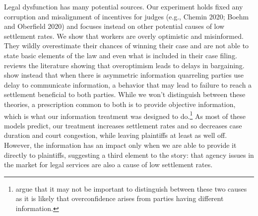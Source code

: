 \documentclass[11pt, a4paper]{article}
\begin{document}
Legal dysfunction has many potential sources. Our experiment holds fixed any corruption and misalignment of incentives for judges (e.g., Chemin 2020; Boehm and Oberfield 2020) and focuses instead on other potential causes of low settlement rates. We show that workers are overly optimistic and misinformed. They wildly overestimate their chances of winning their case and are not able to state basic elements of the law and even what is included in their case filing. \cite{doi:10.1146/annurev-economics-061109-080334} reviews the literature showing that overoptimism leads to delays in bargaining. \cite{Kennan_wilson} show instead that when there is asymmetric information quarreling parties use delay to communicate information, a behavior that may lead to failure to reach a settlement beneficial to both parties. While we won't distinguish between these theories, a prescription common to both is to provide objective information, which is what our information treatment was designed to do.\footnote{\cite{Kennan_wilson} argue that it may not be important to distinguish between these two causes as it is likely that overconfidence arises from parties having different information.} As most of these models predict, our treatment increases settlement rates and so decreases case duration and court congestion, while leaving plaintiffs at least as well off. However, the information has an impact only when we are able to provide it directly to plaintiffs, suggesting a third element to the story: that agency issues in the market for legal services are also a cause of low settlement rates. 
\end{document}
